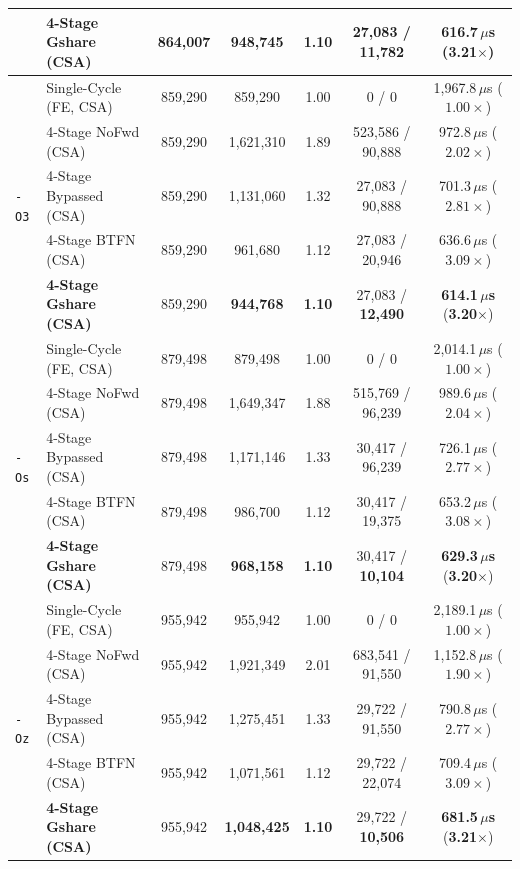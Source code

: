 \begin{table}[htbp]
{\begin{tabular}{|l|l|c|c|c|c|c|}
 & \textbf{4-Stage Gshare (CSA)} & 864,007   & \textbf{948,745} & \textbf{1.10} & 27,083 / \textbf{11,782} & \textbf{616.7\,$\mu$s} (\textbf{3.21$\times$}) \\
\hline
\multirow{5}{*}{\texttt{-O3}} 
 & Single-Cycle (FE, CSA) & 859,290   & 859,290   & 1.00 & 0 / 0             & 1,967.8\,$\mu$s ($1.00\times$) \\
 & 4-Stage NoFwd (CSA)    & 859,290   & 1,621,310 & 1.89 & 523,586 / 90,888   & 972.8\,$\mu$s ($2.02\times$) \\
 & 4-Stage Bypassed (CSA) & 859,290   & 1,131,060 & 1.32 & 27,083 / 90,888    & 701.3\,$\mu$s ($2.81\times$) \\
 & 4-Stage BTFN (CSA)     & 859,290   & 961,680   & 1.12 & 27,083 / 20,946    & 636.6\,$\mu$s ($3.09\times$) \\
 & \textbf{4-Stage Gshare (CSA)} & 859,290   & \textbf{944,768} & \textbf{1.10} & 27,083 / \textbf{12,490} & \textbf{614.1\,$\mu$s} (\textbf{3.20$\times$}) \\
\hline
\multirow{5}{*}{\texttt{-Os}} 
 & Single-Cycle (FE, CSA) & 879,498   & 879,498   & 1.00 & 0 / 0             & 2,014.1\,$\mu$s ($1.00\times$) \\
 & 4-Stage NoFwd (CSA)    & 879,498   & 1,649,347 & 1.88 & 515,769 / 96,239   & 989.6\,$\mu$s ($2.04\times$) \\
 & 4-Stage Bypassed (CSA) & 879,498   & 1,171,146 & 1.33 & 30,417 / 96,239    & 726.1\,$\mu$s ($2.77\times$) \\
 & 4-Stage BTFN (CSA)     & 879,498   & 986,700   & 1.12 & 30,417 / 19,375    & 653.2\,$\mu$s ($3.08\times$) \\
 & \textbf{4-Stage Gshare (CSA)} & 879,498   & \textbf{968,158} & \textbf{1.10} & 30,417 / \textbf{10,104} & \textbf{629.3\,$\mu$s} (\textbf{3.20$\times$}) \\
\hline
\multirow{5}{*}{\texttt{-Oz}} 
 & Single-Cycle (FE, CSA) & 955,942   & 955,942   & 1.00 & 0 / 0             & 2,189.1\,$\mu$s ($1.00\times$) \\
 & 4-Stage NoFwd (CSA)    & 955,942   & 1,921,349 & 2.01 & 683,541 / 91,550   & 1,152.8\,$\mu$s ($1.90\times$) \\
 & 4-Stage Bypassed (CSA) & 955,942   & 1,275,451 & 1.33 & 29,722 / 91,550    & 790.8\,$\mu$s ($2.77\times$) \\
 & 4-Stage BTFN (CSA)     & 955,942   & 1,071,561 & 1.12 & 29,722 / 22,074    & 709.4\,$\mu$s ($3.09\times$) \\
 & \textbf{4-Stage Gshare (CSA)} & 955,942   & \textbf{1,048,425} & \textbf{1.10} & 29,722 / \textbf{10,506} & \textbf{681.5\,$\mu$s} (\textbf{3.21$\times$}) \\

\end{tabular}}
\end{table}

